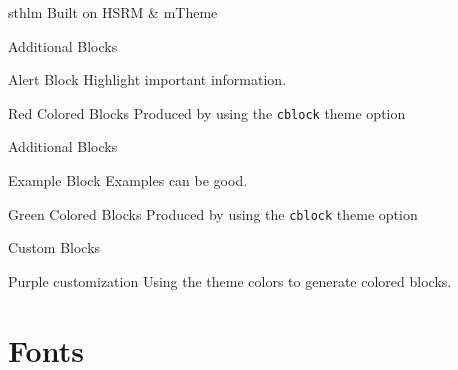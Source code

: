 \documentclass[newPxFont]{beamer}
\begin{document}
\begin{frame}[c]{sthlm Built on HSRM \& mTheme}

\begin{frame}{Additional Blocks}
\begin{alertblock}{Alert Block}
	Highlight important information.
\end{alertblock}

\begingroup
{}
\begin{block}{Red Colored Blocks}
	Produced by using the \texttt{cblock} theme option
\end{block}
\endgroup
\end{frame}


\begin{frame}{Additional Blocks}

\begin{exampleblock}{Example Block}
	Examples can be good.
\end{exampleblock}

\begingroup
{}
\begin{block}{Green Colored Blocks}
	Produced by using the \texttt{cblock} theme option
\end{block}
\endgroup

\end{frame}


\begin{frame}{Custom Blocks}
\begingroup
{}
\begin{block}{Purple customization}
	Using the theme colors to generate colored blocks.
\end{block}
\endgroup

\end{frame}

%
%
\section{Fonts}


\end{frame}
\end{document}
